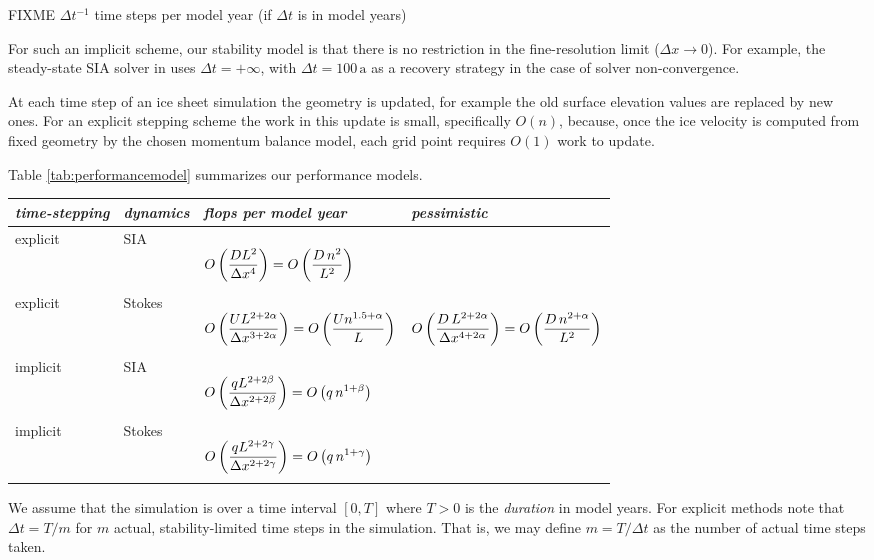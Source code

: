 \documentclass[twocolumn,letterpaper]{igs}
\begin{document}
FIXME $\Delta t^{-1}$ time steps per model year (if $\Delta t$ is in model years)

For such an implicit scheme, our stability model is that there is no restriction in the fine-resolution limit ($\Delta x \to 0$).  For example, the steady-state SIA solver in \cite{Bueler2016} uses $\Delta t=+\infty$, with $\Delta t = 100 \,\text{a}$ as a recovery strategy in the case of solver non-convergence.

At each time step of an ice sheet simulation the geometry is updated, for example the old surface elevation values are replaced by new ones.  For an explicit stepping scheme the work in this update is small, specifically $O(n)$, because, once the ice velocity is computed from fixed geometry by the chosen momentum balance model, each grid point requires $O(1)$ work to update.

Table \ref{tab:performancemodel} summarizes our performance models.

\newcommand{\oo}[1]{{\LARGE \strut} \displaystyle O\left(#1\right)}
\setlength{\tabcolsep}{5pt}
\renewcommand{\arraystretch}{1.5}
\begin{table*}[ht]
{\normalsize
\begin{tabular}{llll}
\emph{time-stepping} & \emph{dynamics} & \emph{flops per model year} & \emph{pessimistic} \\ \hline
explicit & SIA    & $\oo{\frac{D L^2}{\Delta x^4}} = \oo{\frac{D\, n^2}{L^2}}${\Huge \strut} \\
explicit & Stokes & $\oo{\frac{U L^{2+2\alpha}}{\Delta x^{3+2\alpha}}} = \oo{\frac{U n^{1.5+\alpha}}{L}}${\Huge \strut}\phantom{x} & $\oo{\frac{D\, L^{2+2\alpha}}{\Delta x^{4+2\alpha}}} = \oo{\frac{D\,n^{2+\alpha}}{L^2}}$ \\
implicit & SIA    & $\oo{\frac{q L^{2+2\beta}}{\Delta x^{2+2\beta}}} = \oo{q\, n^{1+\beta}}${\Huge \strut} \\
implicit & Stokes & $\oo{\frac{q L^{2+2\gamma}}{\Delta x^{2+2\gamma}}} = \oo{q\, n^{1+\gamma}}${\Huge \strut}
\end{tabular}
}
\caption{FIXME CHECK FOR ERRORS BEFORE INTERPRETATION.  Asymptotic scaling of computational work, measured by floating point operations per model year, for map-plane (2D) time-stepping numerical ice sheet simulations, in the high resolution limit where $\Delta x\to 0$ and $n\to\infty$.  See Table \ref{tab:notation} for notation.}
\label{tab:performancemodel}
\end{table*}

We assume that the simulation is over a time interval $[0,T]$ where $T>0$ is the \emph{duration} in model years.  For explicit methods note that $\Delta t = T/m$ for $m$ actual, stability-limited time steps in the simulation.  That is, we may define $m=T/\Delta t$ as the number of actual time steps taken.
\end{document}
